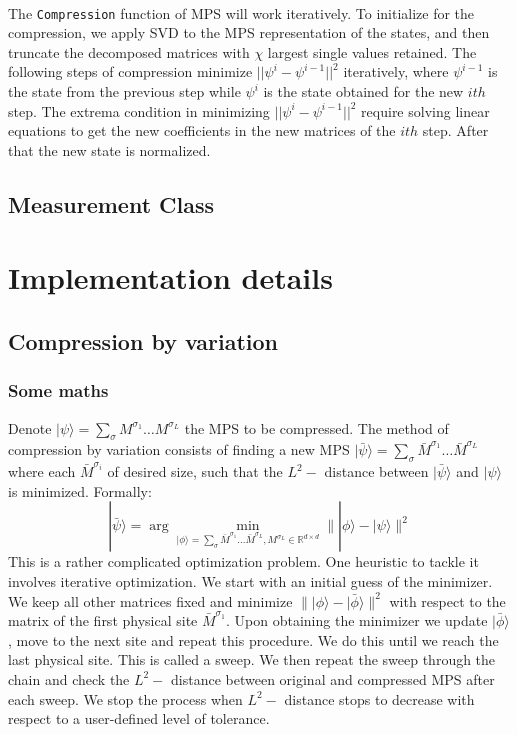\documentclass[english]{article}
\begin{document}
\\[3mm]
The \texttt{Compression} function of MPS will work iteratively. To initialize for the compression, we apply SVD to the MPS representation of the states, and then truncate the decomposed matrices with $\chi$ largest single values retained. The following steps of compression minimize $||\psi^i-\psi^{i-1} ||^{2}$ iteratively, where $\psi^{i-1}$ is the state from the previous step while $\psi^i$ is the state obtained for the new $ith$ step. The extrema condition in minimizing $||\psi^i-\psi^{i-1} ||^{2}$ require solving linear equations to get the new coefficients in the new matrices of the $ith$ step. After that the new state is normalized.
\\[3mm]

\subsection{Measurement Class}

\vspace{3mm}

\section{Implementation details}
\subsection{Compression by variation}
\subsubsection{Some maths}
Denote $|\psi\rangle=\sum_{\sigma}M^{\sigma_1}\dots M^{\sigma_L}$ the MPS to be compressed. The method of compression by variation consists of finding a new MPS $|\bar\psi\rangle=\sum_{\sigma}\bar M^{\sigma_1}\dots 
 \bar M^{\sigma_L}$ where each $\bar M^{\sigma_i}$ of desired size, such that the $L^2-$ distance between $|\bar\psi\rangle$ and $|\psi\rangle$ is minimized. Formally:
 \[
|\bar\psi\rangle = \arg\min_{|\phi\rangle=\sum_{\sigma}\bar M^{\sigma_1}\dots 
 \bar M^{\sigma_L}, M^{\sigma_L} \in \mathbb{R}^{d\times d} }\||\phi \rangle-|\psi\rangle\|^2
 \]
 This is a rather complicated optimization problem. One heuristic to tackle it involves iterative optimization. We start with an initial guess of the minimizer. We keep all other matrices fixed and minimize $\||\phi \rangle-|\bar\phi\rangle\|^2$ with respect to the matrix of the first physical site $\bar M^{\sigma_1}$. Upon obtaining the minimizer we update $|\bar\phi\rangle$, move to the next site and repeat this procedure. We do this until we reach the last physical site. This is called a sweep. We then repeat the sweep through the chain and check the $L^2-$ distance between original and compressed MPS after each sweep. We stop the process when $L^2-$ distance stops to decrease with respect to a user-defined level of tolerance.
\end{document}
